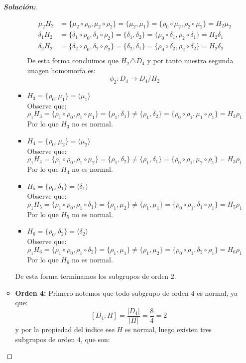 \documentclass[12pt]{article}
\begin{document}
\begin{enumerate}
\begin{proof}[\textbf{Solución:}]
\begin{itemize}
\begin{itemize}
\begin{align*}
                \mu_2H_2&=\{\mu_2\circ\rho_0,\mu_2\circ\rho_2\}=\{\mu_2,\mu_1\}=\{\rho_0\circ\mu_2,\rho_2\circ\mu_2\}=H_2\mu_2\\
                \delta_1H_2&=\{\delta_1\circ\rho_0,\delta_1\circ\rho_2\}=\{\delta_1,\delta_2\}=\{\rho_0\circ\delta_1,\rho_2\circ\delta_1\}=H_2\delta_1\\
                \delta_2H_2&=\{\delta_2\circ\rho_0,\delta_2\circ\rho_2\}=\{\delta_2,\delta_1\}=\{\rho_0\circ\delta_2,\rho_2\circ\delta_2\}=H_2\delta_2\\
            \end{align*}
            De esta forma concluimos que $H_2\triangle D_4$ y por tanto nuestra segunda imagen homomorfa es:
            $$\phi_2:D_4\to D_4/H_2$$
            \item $H_3=\{\rho_0,\mu_1\}=\langle\mu_1\rangle$\\
            Observe que:
            $$\rho_1H_3=\{\rho_1\circ\rho_0,\rho_1\circ\mu_1\}=\{\rho_1,\delta_1\}\neq\{\rho_1,\delta_2\}=\{\rho_0\circ\rho_1,\mu_1\circ\rho_1\}=H_3\rho_1$$
            Por lo que $H_3$ no es normal.
            \item $H_4=\{\rho_0,\mu_2\}=\langle\mu_2\rangle$\\
            Observe que:
            $$\rho_1H_4=\{\rho_1\circ\rho_0,\rho_1\circ\mu_2\}=\{\rho_1,\delta_2\}\neq\{\rho_1,\delta_1\}=\{\rho_0\circ\rho_1,\mu_2\circ\rho_1\}=H_3\rho_1$$
            Por lo que $H_4$ no es normal.
            \item $H_5=\{\rho_0,\delta_1\}=\langle\delta_1\rangle$\\
            Observe que:
            $$\rho_1H_5=\{\rho_1\circ\rho_0,\rho_1\circ\delta_1\}=\{\rho_1,\mu_2\}\neq\{\rho_1,\mu_1\}=\{\rho_0\circ\rho_1,\delta_1\circ\rho_1\}=H_5\rho_1$$
            Por lo que $H_5$ no es normal.
             \item $H_6=\{\rho_0,\delta_2\}=\langle\delta_2\rangle$\\
            Observe que:
            $$\rho_1H_6=\{\rho_1\circ\rho_0,\rho_1\circ\delta_2\}=\{\rho_1,\mu_1\}\neq\{\rho_1,\mu_2\}=\{\rho_0\circ\rho_1,\delta_2\circ\rho_1\}=H_6\rho_1$$
            Por lo que $H_6$ no es normal.
        \end{itemize}
        De esta forma terminamos los subgrupos de orden $2$.
        \item \textbf{Orden 4:} Primero notemos que todo subgrupo de orden $4$ es normal, ya que:
        $$[D_4:H]=\frac{|D_4|}{|H|}=\frac{8}{4}=2$$
        y por la propiedad del índice ese $H$ es normal, luego existen tres subgrupos de orden $4$, que son:

\end{itemize}
\end{proof}
\end{enumerate}
\end{document}
